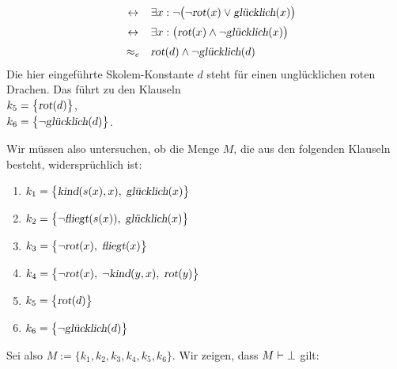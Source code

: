 \begin{enumerate}
$$\begin{array}{lcl}
         \\[0.2cm]
         & \leftrightarrow & \exists x: \neg \bigl(\neg \textsl{rot}(x) \vee \textsl{glücklich}(x) \bigr)
         \\[0.2cm]
         & \leftrightarrow & \exists x: \bigl(\textsl{rot}(x) \wedge \neg \textsl{glücklich}(x) \bigr)
         \\[0.2cm]
         & \approx_e & \textsl{rot}(d) \wedge \neg \textsl{glücklich}(d) \\
        \end{array}
      $$
      Die hier eingeführte Skolem-Konstante $d$ steht für einen unglücklichen roten Drachen.
      Das führt zu den Klauseln \\[0.2cm]
      \hspace*{1.3cm} $k_5 = \bigl\{ \textsl{rot}(d) \bigl\}$, \\[0.2cm]
      \hspace*{1.3cm} $k_6 = \bigl\{ \neg \textsl{glücklich}(d) \bigl\}$.
\end{enumerate}
Wir müssen also untersuchen, ob die Menge $M$, die aus den folgenden Klauseln besteht,
widersprüchlich ist: 
\begin{enumerate}
\item $k_1 = \bigl\{ \textsl{kind}(s(x),x),\; \textsl{glücklich}(x) \bigl\}$  
\item $k_2 = \bigl\{ \neg \textsl{fliegt}(s(x)),\; \textsl{glücklich}(x) \bigl\}$
\item $k_3 = \bigl\{ \neg \textsl{rot}(x),\; \textsl{fliegt}(x) \bigl\}$
\item $k_4 = \bigl\{ \neg \textsl{rot}(x),\; \neg \textsl{kind}(y,x),\; \textsl{rot}(y) \bigl\}$
\item $k_5 = \bigl\{ \textsl{rot}(d) \bigl\}$ 
\item $k_6 = \bigl\{ \neg \textsl{glücklich}(d) \bigl\}$
\end{enumerate}
Sei also $M := \bigl\{k_1,k_2,k_3,k_4,k_5,k_6\bigl\}$.
Wir  zeigen, dass $M \vdash \bot$ gilt:
